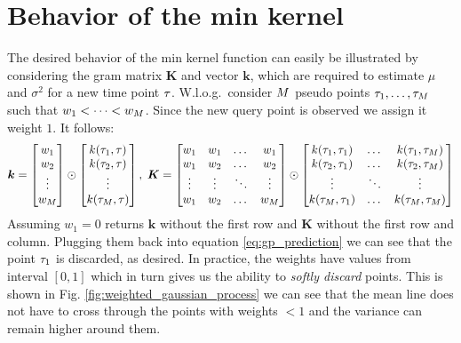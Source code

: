\section{Behavior of the min kernel}\label{gp_min_kernel}

The desired behavior of the min kernel function can easily be illustrated by considering the gram matrix $\bm{K}$  and vector  $\bm{k}$, which are required to estimate $\mu$ and $\sigma^2$ for a new time point $\tau$.
W.l.o.g.\ consider $M$ pseudo points $\tau_1, \dots, \tau_M$ such that $w_1 < \dots < w_M$. Since the new query point is observed we assign it weight $1$. It follows:
\begin{equation}\label{eq:min-kernel-example}
\bm{k} = \begin{bmatrix}
   w_1 \\
   w_2 \\
   \vdots \\
   w_M
\end{bmatrix}
\odot
\begin{bmatrix}
   k(\tau_1, \tau) \\
   k(\tau_2, \tau) \\
   \vdots \\
   k(\tau_M, \tau) \\
\end{bmatrix},
\;
\bm{K} =
\begin{bmatrix}
   w_1 & w_1 & \dots & w_1 \\
   w_1 & w_2 & \dots & w_2 \\
   \vdots & \vdots & \ddots & \vdots \\
   w_1 & w_2 & \dots & w_M
\end{bmatrix}
\odot
\begin{bmatrix}
   k(\tau_1, \tau_1) & \dots & k(\tau_1, \tau_M) \\
   k(\tau_2, \tau_1) & \dots & k(\tau_2, \tau_M) \\
   \vdots & \ddots & \vdots \\
   k(\tau_M, \tau_1) & \dots & k(\tau_M, \tau_M)
\end{bmatrix}
\end{equation}
Assuming $w_1=0$ returns $\bm{k}$ without the first row and $\bm{K}$ without the first row and column. Plugging them back into equation \ref{eq:gp_prediction} we can see that the point $\tau_1$ is discarded, as desired.
In practice, the weights have values from interval $[0, 1]$ which in turn gives us the ability to \textit{softly discard} points. This is shown in Fig. \ref{fig:weighted_gaussian_process} we can see that the mean line does not have to cross through the points with weights $<1$ and the variance can remain higher around them.